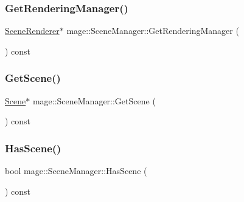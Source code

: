 \subsubsection{\texorpdfstring{Get\+Rendering\+Manager()}{GetRenderingManager()}}
{\footnotesize\ttfamily \hyperlink{classmage_1_1_scene_renderer}{Scene\+Renderer}$\ast$ mage\+::\+Scene\+Manager\+::\+Get\+Rendering\+Manager (\begin{DoxyParamCaption}{ }\end{DoxyParamCaption}) const}

\hypertarget{classmage_1_1_scene_manager_a55d720c9f90cfc46dbf07d46537072c1}{}\label{classmage_1_1_scene_manager_a55d720c9f90cfc46dbf07d46537072c1} 
\subsubsection{\texorpdfstring{Get\+Scene()}{GetScene()}}
{\footnotesize\ttfamily \hyperlink{classmage_1_1_scene}{Scene}$\ast$ mage\+::\+Scene\+Manager\+::\+Get\+Scene (\begin{DoxyParamCaption}{ }\end{DoxyParamCaption}) const\hspace{0.3cm}{\ttfamily [noexcept]}}

\hypertarget{classmage_1_1_scene_manager_ac767593112ea1d8b47cc79283cf7c47e}{}\label{classmage_1_1_scene_manager_ac767593112ea1d8b47cc79283cf7c47e} 
\subsubsection{\texorpdfstring{Has\+Scene()}{HasScene()}}
{\footnotesize\ttfamily bool mage\+::\+Scene\+Manager\+::\+Has\+Scene (\begin{DoxyParamCaption}{ }\end{DoxyParamCaption}) const\hspace{0.3cm}{\ttfamily [noexcept]}}

\hypertarget{classmage_1_1_scene_manager_adeb1fd1d9f40229ccb0ef8adfb55f4cc}{}\label{classmage_1_1_scene_manager_adeb1fd1d9f40229ccb0ef8adfb55f4cc} 
